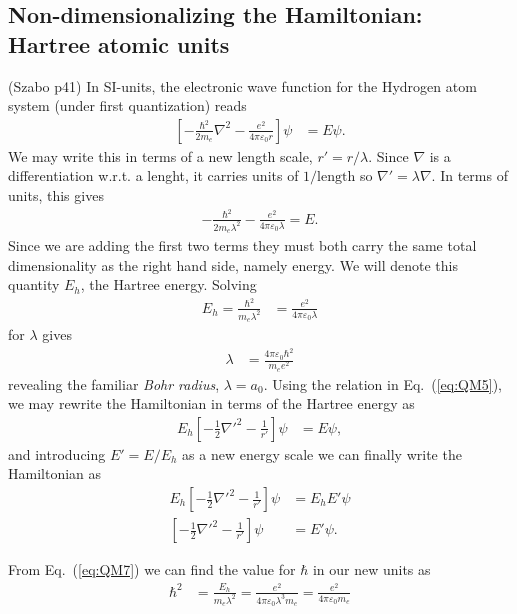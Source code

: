 \documentclass[a4paper]{article}
\newcommand{\eq} [1]{Eq.\ (\ref{eq:#1})}
\newcommand{\nn}{\nonumber}
\begin{document}
\subsection{Non-dimensionalizing the Hamiltonian: Hartree atomic units}
(Szabo p41) In SI-units, the electronic wave function for the Hydrogen atom system (under first quantization) reads 
\begin{align}
\left[-\frac{\hbar^2}{2m_e}\nabla^2 - \frac{e^2}{4\pi\varepsilon_0 r}\right] \psi &= E\psi.
\end{align}
We may write this in terms of a new length scale, $r' = r / \lambda$. Since $\nabla$ is a differentiation w.r.t. a lenght, it carries units of $1/\text{length}$ so $\nabla'=\lambda \nabla$. In terms of units, this gives 
\begin{align}
-\frac{\hbar^2}{2m_e\lambda^2} - \frac{e^2}{4\pi\varepsilon_0 \lambda} = E. \label{eq:QM6}
\end{align}
Since we are adding the first two terms they must both carry the same total dimensionality as the right hand side, namely energy. We will denote this quantity $E_h$, the Hartree energy. Solving 
\begin{align}
E_h=\frac{\hbar^2}{m_e\lambda^2} &= \frac{e^2}{4\pi\varepsilon_0 \lambda} \label{eq:QM7}
\end{align}
for $\lambda$ gives 
\begin{align}
\lambda &= \frac{4\pi \varepsilon_0 \hbar^2}{m_e e^2}
\end{align}
revealing the familiar \emph{Bohr radius}, $\lambda=a_0$. Using the relation in \eq{QM5}, we may rewrite the Hamiltonian in terms of the Hartree energy as
\begin{align}
E_h\left[-\frac{1}{2}\nabla'^2 - \frac{1}{r'}\right] \psi &= E\psi,
\end{align}
and introducing $E'=E/E_h$ as a new energy scale we can finally write the Hamiltonian as
\begin{align}
E_h\left[-\frac{1}{2}\nabla'^2 - \frac{1}{r'}\right] \psi &= E_hE'\psi \nn\\
\left[-\frac{1}{2}\nabla'^2 - \frac{1}{r'}\right] \psi &= E'\psi.
\end{align}

From \eq{QM7} we can find the value for $\hbar$ in our new units as
\begin{align}
\hbar^2 &= \frac{E_h}{m_e\lambda^2} = \frac{e^2}{4\pi \varepsilon_0 \lambda^3 m_e} = \frac{e^2}{4\pi \varepsilon_0 m_e }
\end{align}
\end{document}
